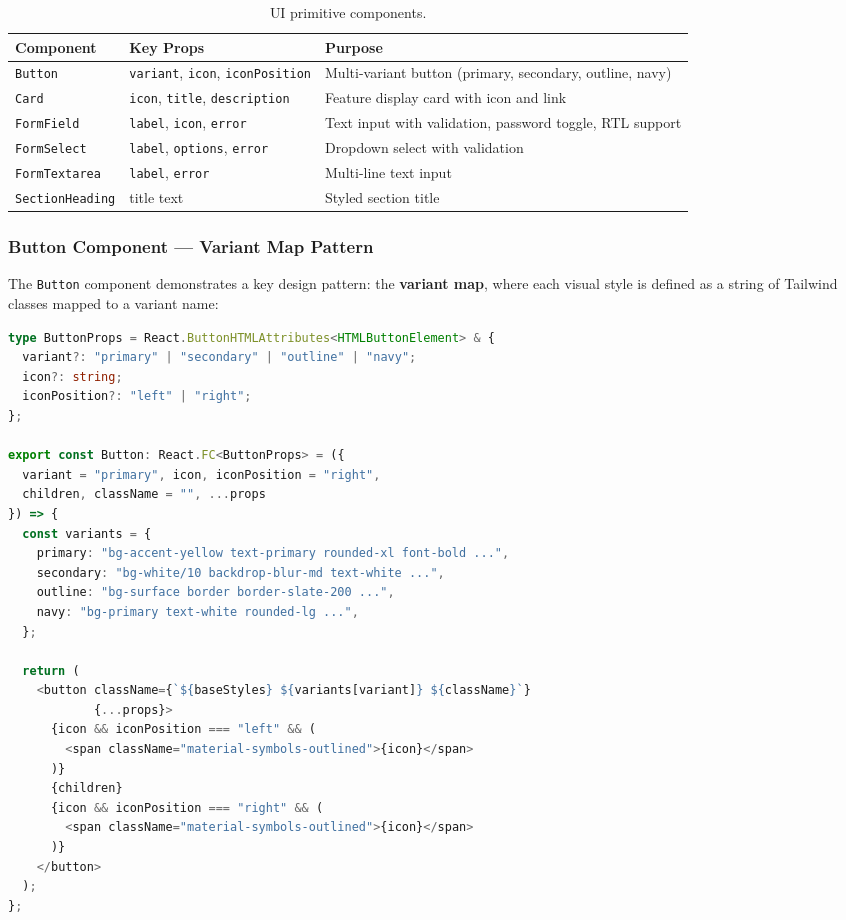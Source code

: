 \documentclass[12pt,a4paper]{article}
\begin{document}
\begin{table}[H]
\centering
\begin{tabular}{@{}llp{6.5cm}@{}}
\toprule
\textbf{Component} & \textbf{Key Props} & \textbf{Purpose} \\
\midrule
\texttt{Button} & \texttt{variant}, \texttt{icon}, \texttt{iconPosition} & Multi-variant button (primary, secondary, outline, navy) \\
\texttt{Card} & \texttt{icon}, \texttt{title}, \texttt{description} & Feature display card with icon and link \\
\texttt{FormField} & \texttt{label}, \texttt{icon}, \texttt{error} & Text input with validation, password toggle, RTL support \\
\texttt{FormSelect} & \texttt{label}, \texttt{options}, \texttt{error} & Dropdown select with validation \\
\texttt{FormTextarea} & \texttt{label}, \texttt{error} & Multi-line text input \\
\texttt{SectionHeading} & title text & Styled section title \\
\bottomrule
\end{tabular}
\caption{UI primitive components.}
\end{table}

\subsubsection{Button Component — Variant Map Pattern}

The \texttt{Button} component demonstrates a key design pattern: the \textbf{variant map}, where each visual style is defined as a string of Tailwind classes mapped to a variant name:

\begin{lstlisting}[language=TypeScript,title={Button.tsx — Variant map pattern (key parts)}]
type ButtonProps = React.ButtonHTMLAttributes<HTMLButtonElement> & {
  variant?: "primary" | "secondary" | "outline" | "navy";
  icon?: string;
  iconPosition?: "left" | "right";
};

export const Button: React.FC<ButtonProps> = ({
  variant = "primary", icon, iconPosition = "right",
  children, className = "", ...props
}) => {
  const variants = {
    primary: "bg-accent-yellow text-primary rounded-xl font-bold ...",
    secondary: "bg-white/10 backdrop-blur-md text-white ...",
    outline: "bg-surface border border-slate-200 ...",
    navy: "bg-primary text-white rounded-lg ...",
  };

  return (
    <button className={`${baseStyles} ${variants[variant]} ${className}`}
            {...props}>
      {icon && iconPosition === "left" && (
        <span className="material-symbols-outlined">{icon}</span>
      )}
      {children}
      {icon && iconPosition === "right" && (
        <span className="material-symbols-outlined">{icon}</span>
      )}
    </button>
  );
};
\end{lstlisting}
\end{document}
